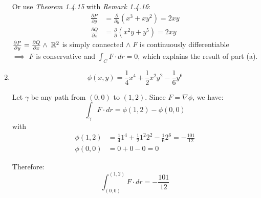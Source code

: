 \begin{solution}
\begin{enumerate}
		      Or use \emph{Theorem 1.4.15} with \emph{Remark 1.4.16}:
		      $$
			      \begin{aligned}
				      \frac{\partial P}{\partial y} & = \frac{\partial}{\partial y} (x^3 + xy^2) = 2xy \\
				      \frac{\partial Q}{\partial x} & = \frac{\partial}{\partial } (x^2 y + y^5) = 2xy
			      \end{aligned}
		      $$
		      $\frac{\partial P}{\partial y} = \frac{\partial Q}{\partial x} \wedge \; \mathbb{R}^2$ is simply connected $ \wedge \; F$ is continuously differentiable \\
		      $\implies$ $F$ is conservative and $\int_C F \cdot dr = 0$, which explains the result of part (a).

		\item
		      $$
			      \phi(x,y) = \frac{1}{4}x^4 + \frac{1}{2}x^2 y^2 - \frac{1}{6} y^6
		      $$

		      Let $\gamma$ be any path from $(0,0)$ to $(1,2)$. Since $F = \nabla \phi$, we have:
		      $$
			      \int_\gamma F \cdot dr = \phi(1,2) - \phi(0,0)
		      $$
		      with
		      $$
			      \begin{aligned}
				      \phi(1,2) & = \frac{1}{4} 1^4 + \frac{1}{2} 1^2 2^2 - \frac{1}{6} 2^6 = -\frac{101}{12} \\
				      \phi(0,0) & = 0 + 0 - 0 = 0
			      \end{aligned}
		      $$

		      Therefore:
		      $$
			      \int_{(0,0)}^{(1,2)} F \cdot dr = -\frac{101}{12}
		      $$
	\end{enumerate}
\end{solution}
